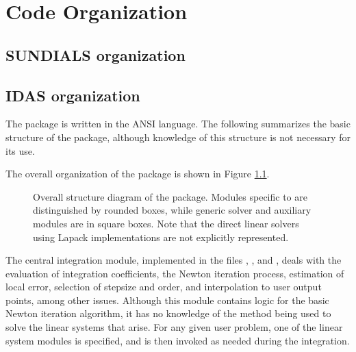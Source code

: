 \chapter{Code Organization}\label{s:organization}

\section{SUNDIALS organization}\label{ss:sun_org}


\section{IDAS organization}\label{ss:idas_org}

The {\idas} package is written in the ANSI {\C} language. The following
summarizes the basic structure of the package, although knowledge
of this structure is not necessary for its use.

The overall organization of the {\idas} package is shown in Figure
\ref{f:idasorg}.
\begin{figure}
{\centerline{}}
\caption [Overall structure diagram of the {\idas} package]
{Overall structure diagram of the {\idas} package.
  Modules specific to {\idas} are distinguished by rounded boxes, while 
  generic solver and auxiliary modules are in square boxes.
  Note that the direct linear solvers using Lapack implementations are not 
  explicitly represented.}
\label{f:idasorg}
\end{figure}
The central integration module, implemented in the files ,
, and , deals with the evaluation of integration 
coefficients, the Newton iteration process, estimation of local error,
selection of stepsize and order, and interpolation to user output
points, among other issues.  Although this module contains logic for
the basic Newton iteration algorithm, it has no knowledge of the
method being used to solve the linear systems that arise.  For any
given user problem, one of the linear system modules is specified, and
is then invoked as needed during the integration. 

